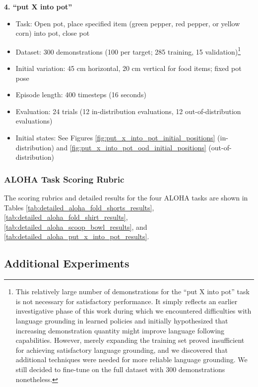 \documentclass[conference]{IEEEtran}
\begin{document}
\textbf{4. ``put X into pot''}
\begin{itemize}
    \item Task: Open pot, place specified item (green pepper, red pepper, or yellow corn) into pot, close pot
    \item Dataset: 300 demonstrations (100 per target; 285 training, 15 validation)\footnote{This relatively large number of demonstrations for the ``put X into pot'' task is not necessary for satisfactory performance. It simply reflects an earlier investigative phase of this work during which we encountered difficulties with language grounding in learned policies and initially hypothesized that increasing demonstration quantity might improve language following capabilities. However, merely expanding the training set proved insufficient for achieving satisfactory language grounding, and we discovered that additional techniques were needed for more reliable language grounding. We still decided to fine-tune on the full dataset with 300 demonstrations nonetheless.}
    \item Initial variation: 45 cm horizontal, 20 cm vertical for food items; fixed pot pose
    \item Episode length: 400 timesteps (16 seconds)
    \item Evaluation: 24 trials (12 in-distribution evaluations, 12 out-of-distribution evaluations)
    \item Initial states: See Figures \ref{fig:put_x_into_pot_initial_positions} (in-distribution) and \ref{fig:put_x_into_pot_ood_initial_positions} (out-of-distribution)
\end{itemize}




\subsubsection{ALOHA Task Scoring Rubric}
\label{app:aloha_scoring_rubrics}

The scoring rubrics and detailed results for the four ALOHA tasks are shown in Tables \ref{tab:detailed_aloha_fold_shorts_results}, \ref{tab:detailed_aloha_fold_shirt_results}, \ref{tab:detailed_aloha_scoop_bowl_results}, and \ref{tab:detailed_aloha_put_x_into_pot_results}.


\vspace{-0.1cm}

\subsection{Additional Experiments}
\label{app:additional_experiments}
\end{document}
